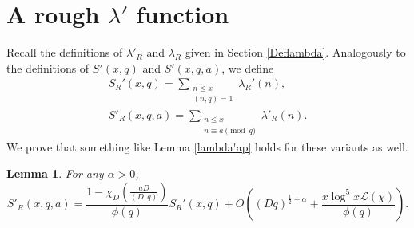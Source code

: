 \documentclass{amsart}
\newtheorem{lemma}[theorem]{Lemma}
\begin{document}
\section{A rough $\lambda'$ function}\label{lambdaR}

Recall the definitions of $\lambda'_R$ and $\lambda_R$ given in Section \ref{Deflambda}.  Analogously to the definitions of $S'(x,q)$ and $S'(x,q,a)$, we define
\begin{gather*}
S_R'(x,q)=\sum_{\substack{n\leq x \\(n,q)=1}}\lambda_R'(n),\\
S'_R(x,q,a)=\sum_{\substack{n\leq x \\n\equiv a \pmod q}}\lambda'_R(n).
\end{gather*}
We prove that something like Lemma \ref{lambda'ap} holds for these variants as well.
\begin{lemma}\label{DR}
For any $\alpha>0$,
$$S'_R(x,q,a)=\frac{1-\chi_D\left(\frac{aD}{(D,q)}\right)}{\phi(q)}S_R'(x,q)+O\left((Dq)^{\frac 12+\alpha}+\frac{x\log^5 x\mathcal L(\chi)}{\phi(q)}\right).$$
\end{lemma}
\end{document}
